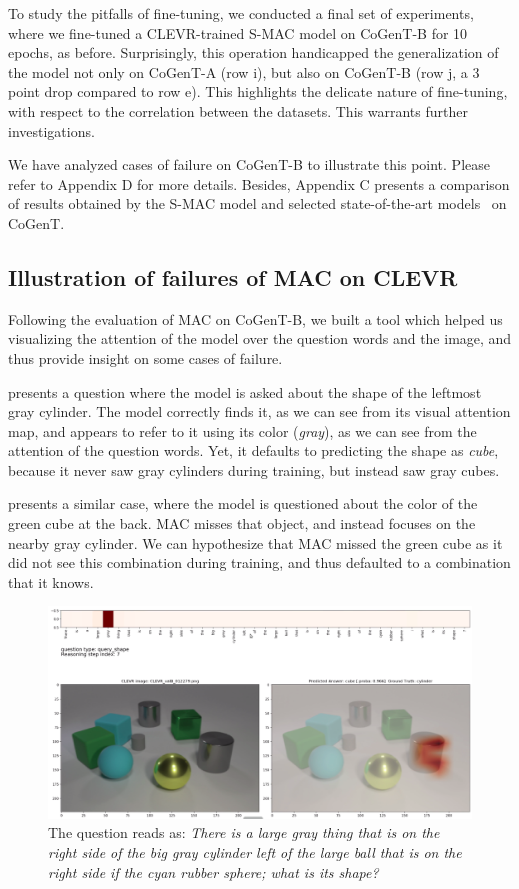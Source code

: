 To study the pitfalls of fine-tuning, we conducted a final set of experiments, where we fine-tuned a CLEVR-trained S-MAC model on CoGenT-B for 10 epochs, as before. Surprisingly, this operation handicapped the generalization of the model not only on CoGenT-A (row i), but also on CoGenT-B (row j, a 3 point drop compared to row e). This highlights the delicate nature of fine-tuning, with respect to the correlation between the datasets. This warrants further investigations.

We have analyzed cases of failure on CoGenT-B to illustrate this point. Please refer to Appendix D for more details. Besides, Appendix C presents a comparison of results obtained by the S-MAC model and selected state-of-the-art models~\cite{johnson2017inferring,perez2017film,mascharka2018transparency}  on CoGenT.


\subsection{Illustration of failures of MAC on CLEVR}
Following the evaluation of MAC on CoGenT-B, we built a tool which helped us visualizing the attention of the model over the question words and the image, and thus provide insight on some cases of failure.

 presents a question where the model is asked about the shape of the leftmost gray cylinder. The model correctly finds it, as we can see from its visual attention map, and appears to refer to it using its color (\textit{gray}), as we can see from the attention of the question words. Yet, it defaults to predicting the shape as \textit{cube}, because it never saw gray cylinders during training, but instead saw gray cubes.

 presents a similar case, where the model is questioned about the color of the green cube at the back. MAC misses that object, and instead focuses on the nearby gray cylinder. We can hypothesize that MAC missed the green cube as it did not see this combination during training, and thus defaulted to a combination that it knows.


\begin{figure}[htbp]
	\centering
	\includegraphics[width=\textwidth]{../img/fail_mac_cogent_b_shape.png}
	\caption{The question reads as: \textit{There is a large gray thing that is on the right side of the big gray cylinder left of the large ball that is on the right side if the cyan rubber sphere; what is its shape?}}
	\label{fig:fail_mac_shape}
\end{figure}


